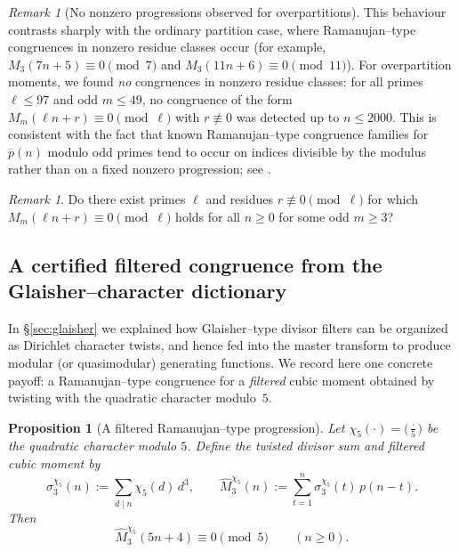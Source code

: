 \documentclass[11pt]{article}
\newtheorem{proposition}[theorem]{Proposition}
\theoremstyle{definition}
\theoremstyle{remark}
\newtheorem{remark}[theorem]{Remark}
\begin{document}
\begin{remark}[No nonzero progressions observed for overpartitions]\label{rem:overpart-nonzero}
This behaviour contrasts sharply with the ordinary partition case, where
Ramanujan--type congruences in nonzero residue classes occur (for example,
$M_3(7n+5)\equiv 0\pmod{7}$ and $M_3(11n+6)\equiv 0\pmod{11}$).  For overpartition moments, we found \emph{no} congruences in nonzero residue classes:
for all primes $\ell\le 97$ and odd $m\le 49$, no congruence of the form
$M^{\overline{\ }}_m(\ell n+r)\equiv 0\pmod{\ell}$ with $r\not\equiv 0$ was
detected up to $n\le 2000$.  This is consistent with the fact that known
Ramanujan--type congruence families for $\overline{p}(n)$ modulo odd primes tend
to occur on indices divisible by the modulus rather than on a fixed nonzero
progression; see \cite{ChenSunWangZhang2015,RyanSirolliVillegasMoralesZheng2024}.
\end{remark}

\begin{remark}\label{q:overpart-ram}
Do there exist primes $\ell$ and residues $r\not\equiv 0\pmod{\ell}$ for which
$M^{\overline{\ }}_m(\ell n+r)\equiv 0\pmod{\ell}$ holds for all $n\ge0$ for some
odd $m\ge 3$?
\end{remark}

\subsection{A certified filtered congruence from the Glaisher--character dictionary}\label{subsec:filtered-M3}

In \S\ref{sec:glaisher} we explained how Glaisher--type divisor filters can be
organized as Dirichlet character twists, and hence fed into the master
transform to produce modular (or quasimodular) generating functions.  We record
here one concrete payoff: a Ramanujan--type congruence for a \emph{filtered}
cubic moment obtained by twisting with the quadratic character modulo~$5$.

\begin{proposition}[A filtered Ramanujan--type progression]\label{prop:M3hat-legendre5}
Let $\chi_5(\cdot)=\big(\frac{\cdot}{5}\big)$ be the quadratic character modulo
$5$.  Define the twisted divisor sum and filtered cubic moment by
\[
\sigma^{\chi_5}_3(n):=\sum_{d\mid n}\chi_5(d)\,d^3,
\qquad
\widehat{M}^{\chi_5}_3(n):=\sum_{t=1}^{n}\sigma^{\chi_5}_3(t)\,p(n-t).
\]
Then
\[
\widehat{M}^{\chi_5}_3(5n+4)\equiv 0\pmod{5}\qquad(n\ge 0).
\]
\end{proposition}
\end{document}

